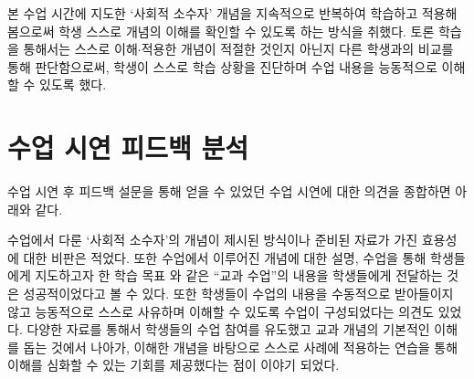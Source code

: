 \documentclass[10pt, a4paper, chapter]{oblivoir}
\begin{document}
\noindent
    본 수업 시간에 지도한 `사회적 소수자' 개념을 지속적으로 반복하여 학습하고 적용해봄으로써 학생 스스로 개념의 이해를 확인할 수 있도록 하는 방식을 취했다. 
    토론 학습을 통해서는 스스로 이해$\cdot$적용한 개념이 적절한 것인지 아닌지 다른 학생과의 비교를 통해 판단함으로써, 학생이 스스로 학습 상황을 진단하며 
    수업 내용을 능동적으로 이해할 수 있도록 했다.  

    \section{수업 시연 피드백 분석}

    수업 시연 후 피드백 설문을 통해 얻을 수 있었던 수업 시연에 대한 의견을 종합하면 아래와 같다. \newline

\noindent
    수업에서 다룬 `사회적 소수자'의 개념이 제시된 방식이나 준비된 자료가 가진 효용성에 대한 비판은 적었다. 또한 수업에서 이루어진 개념에 대한 설명, 수업을 통해 학생들에게 지도하고자 한 학습 목표 와 같은 ``교과 수업''의 내용을 학생들에게 전달하는 것은 성공적이었다고 볼 수 있다. 
    또한 학생들이 수업의 내용을 수동적으로 받아들이지 않고 능동적으로 스스로 사유하며 이해할 수 있도록 수업이 구성되었다는 의견도 있었다. 
    다양한 자료를 통해서 학생들의 수업 참여를 유도했고 교과 개념의 기본적인 이해를 돕는 것에서 나아가, 이해한 개념을 바탕으로 스스로 사례에 적용하는 연습을 통해 이해를 심화할 수 있는 기회를 제공했다는 점이 이야기 되었다. \newline
\end{document}
